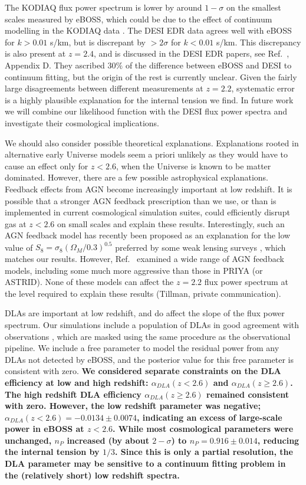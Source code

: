 The KODIAQ flux power spectrum is lower by around $1-\sigma$ on the smallest scales measured by eBOSS, which could be due to the effect of continuum modelling in the KODIAQ data \cite{2022MNRAS.509.2842K}.
The DESI EDR data agrees well with eBOSS for $k > 0.01$ s/km, but is discrepant by $> 2 \sigma$ for $k < 0.01$ s/km.
This discrepancy is also present at $z=2.4$, and is discussed in the DESI EDR papers, see Ref.~\cite{2023arXiv230606311R}, Appendix D.
They ascribed $30\%$ of the difference between eBOSS and DESI to continuum fitting, but the origin of the rest is currently unclear.
Given the fairly large disagreements between different measurements at $z=2.2$, systematic error is a highly plausible explanation for the internal tension we find.
In future work we will combine our likelihood function with the DESI flux power spectra and investigate their cosmological implications.

We should also consider possible theoretical explanations.
Explanations rooted in alternative early Universe models seem a priori unlikely as they would have to cause an effect only for $z < 2.6$, when the Universe is known to be matter dominated. 
However, there are a few possible astrophysical explanations.
Feedback effects from AGN become increasingly important at low redshift.
It is possible that a stronger AGN feedback prescription than we use, or than is implemented in current cosmological simulation suites, could efficiently disrupt gas at $z < 2.6$ on small scales and explain these results.
Interestingly, such an AGN feedback model has recently been proposed as an explanation for the low value of $S_8 = \sigma_8 (\Omega_M/0.3)^{0.5}$ preferred by some weak lensing surveys \cite{2022MNRAS.516.5355A}, which matches our results.
However, Ref.~\cite{2023AJ....166..228T} examined a wide range of AGN feedback models, including some much more aggressive than those in PRIYA (or ASTRID).
None of these models can affect the $z=2.2$ flux power spectrum at the level required to explain these results (Tillman, private communication).

DLAs are important at low redshift, and do affect the slope of the flux power spectrum.
Our simulations include a population of DLAs in good agreement with observations \cite{2023simsuite}, which are masked using the same procedure as the observational pipeline.
We include a free parameter to model the residual power from any DLAs not detected by eBOSS, and the posterior value for this free parameter is consistent with zero.
\textbf{We considered separate constraints on the DLA efficiency at low and high redshift: $\alpha_{DLA}(z < 2.6)$ and $\alpha_{DLA}(z \geq 2.6)$. The high redshift DLA efficiency $\alpha_{DLA}(z \geq 2.6)$ remained consistent with zero. However, the low redshift parameter was negative; $\alpha_{DLA}(z < 2.6) = -0.0134 \pm 0.0074$, indicating an excess of large-scale power in eBOSS at $z < 2.6$. While most cosmological parameters were unchanged, $n_P$ increased (by about $2-\sigma$) to $n_P = 0.916 \pm 0.014$, reducing the internal tension by $1/3$. Since this is only a partial resolution, the DLA parameter may be sensitive to a continuum fitting problem in the (relatively short) low redshift spectra.}

